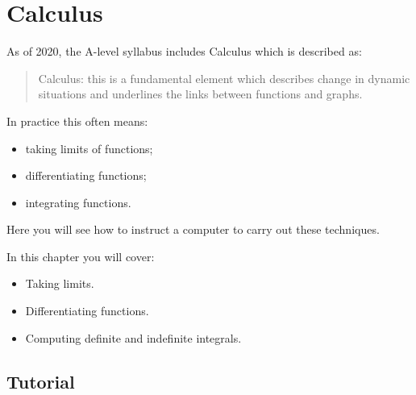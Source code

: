 \chapter{Calculus}
\label{\detokenize{tools-for-mathematics/03-calculus/introduction/main:calculus}}\label{\detokenize{tools-for-mathematics/03-calculus/introduction/main::doc}}

As of 2020, the A-level syllabus includes Calculus which
is described 
as:

\begin{quote}


Calculus: this is a fundamental element which describes change in dynamic
situations and underlines the links between functions and graphs.
\end{quote}


In practice this often means:
\begin{itemize}
\item 

taking limits of functions;

\item 

differentiating functions;

\item 

integrating functions.

\end{itemize}


Here you will see how to instruct a computer to carry out these techniques.



In this chapter you will cover:
\begin{itemize}
\item 

Taking limits.

\item 

Differentiating functions.

\item 

Computing definite and indefinite integrals.

\end{itemize}





\section{Tutorial}
\label{\detokenize{tools-for-mathematics/03-calculus/tutorial/main:tutorial}}\label{\detokenize{tools-for-mathematics/03-calculus/tutorial/main::doc}}

